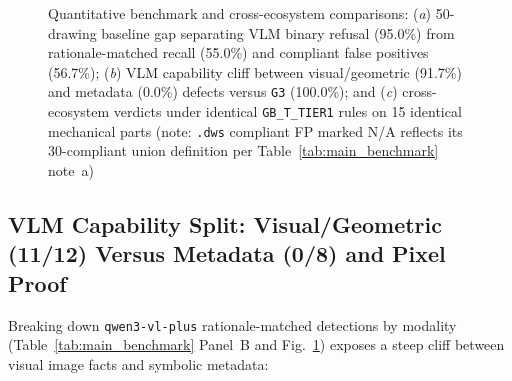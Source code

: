\documentclass[nocopyright,nolists,upint,varvw,hyphenate]{asmejour}
\begin{document}
\begin{figure}[t]
\begin{subfigure}[t]{0.30\textwidth}
{\label{fig:vlm_modality_split}
}%
\end{subfigure}%
\hfill
\begin{subfigure}[t]{0.30\textwidth}
%
\end{subfigure}%
\caption{Quantitative benchmark and cross-ecosystem comparisons: (\emph{a}) 50-drawing baseline gap separating VLM binary refusal (95.0\%) from rationale-matched recall (55.0\%) and compliant false positives (56.7\%); (\emph{b}) VLM capability cliff between visual/geometric (91.7\%) and metadata (0.0\%) defects versus \texttt{G3} (100.0\%); and (\emph{c}) cross-ecosystem verdicts under identical \texttt{GB\_T\_TIER1} rules on 15 identical mechanical parts (note: \texttt{.dws} compliant FP marked N/A reflects its 30-compliant union definition per Table~\ref{tab:main_benchmark} note~a)\label{fig:benchmark_charts}}
\end{figure}

\subsection{VLM Capability Split: Visual/Geometric (11/12) Versus Metadata (0/8) and Pixel Proof}\label{sec:vlm_split}

Breaking down \texttt{qwen3-vl-plus} rationale-matched detections by modality (Table~\ref{tab:main_benchmark} Panel~B and Fig.~\ref{fig:vlm_modality_split}) exposes a steep cliff between visual image facts and symbolic metadata:
\end{document}
